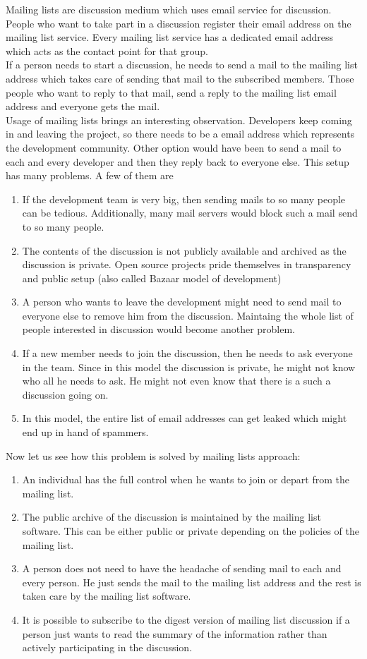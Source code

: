 Mailing lists are discussion medium which uses email service for discussion. People who want to take part in a 
discussion register their email address on the mailing list service. Every mailing list service has a dedicated 
email address which acts as the contact point for that group. 
\\
If a person needs to start a discussion, he needs to send a mail to the mailing list address which takes care of 
sending that mail to the subscribed members. Those people who want to reply to that mail, send a reply to 
the mailing list email address and everyone gets the mail.
\\
Usage of mailing lists brings an interesting observation. Developers keep coming in and leaving the project, so 
there needs to be a email address which represents the development community. Other option would have been to 
send a mail to each and every developer and then they reply back to everyone else. This setup has many problems. 
A few of them are
\begin{enumerate}
\item If the development team is very big, then sending mails to so many people can be tedious. Additionally, 
many mail servers would block such a mail send to so many people.
\item The contents of the discussion is not publicly available and archived as the discussion is private. Open 
source projects pride themselves in transparency and public setup (also called Bazaar model of development)
\item A person who wants to leave the development might need to send mail to everyone else to remove him from 
the discussion. Maintaing the whole list of people interested in discussion would become another problem.
\item If a new member needs to join the discussion, then he needs to ask everyone in the team. Since in this 
model the discussion is private, he might not know who all he needs to ask. He might not even know that 
there is a such a discussion going on.
\item In this model, the entire list of email addresses can get leaked which might end up in hand of spammers.
\end{enumerate}

Now let us see how this problem is solved by mailing lists approach:\
\begin{enumerate}
\item An individual has the full control when he wants to join or depart from the mailing list.
\item The public archive of the discussion is maintained by the mailing list software. This can be either public 
or private depending on the policies of the mailing list.
\item A person does not need to have the headache of sending mail to each and every person. He just sends the mail 
to the mailing list address and the rest is taken care by the mailing list software.
\item It is possible to subscribe to the digest version of mailing list discussion if a person just wants to read the 
summary of the information rather than actively participating in the discussion.
\end{enumerate}

